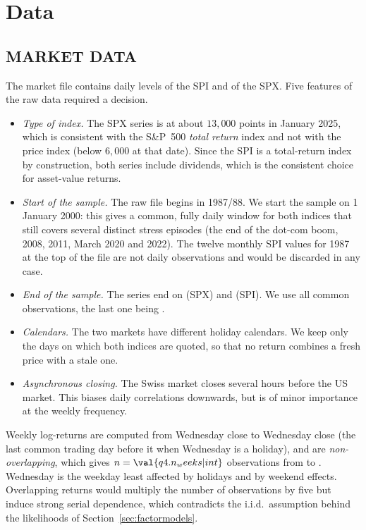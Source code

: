 \section{Data}
\label{sec:data}

\subsection{MARKET DATA}
The market file contains daily levels of the SPI and of the SPX. Five features of the raw data required a decision.
\begin{itemize}
\item \emph{Type of index.} The SPX series is at about $13{,}000$ points in January 2025, which is consistent with the S\&P~500 \emph{total return} index and not with the price index (below $6{,}000$ at that date). Since the SPI is a total-return index by construction, both series include dividends, which is the consistent choice for asset-value returns.
\item \emph{Start of the sample.} The raw file begins in 1987/88. We start the sample on 1 January 2000: this gives a common, fully daily window for both indices that still covers several distinct stress episodes (the end of the dot-com boom, 2008, 2011, March 2020 and 2022). The twelve monthly SPI values for 1987 at the top of the file are not daily observations and would be discarded in any case.
\item \emph{End of the sample.} The series end on  (SPX) and  (SPI). We use all common observations, the last one being .
\item \emph{Calendars.} The two markets have different holiday calendars. We keep only the  days on which both indices are quoted, so that no return combines a fresh price with a stale one.
\item \emph{Asynchronous closing.} The Swiss market closes several hours before the US market. This biases daily correlations downwards, but is of minor importance at the weekly frequency.
\end{itemize}
Weekly log-returns are computed from Wednesday close to Wednesday close (the last common trading day before it when Wednesday is a holiday), and are \emph{non-overlapping}, which gives $n=\val{q4.n_weeks|int}$ observations from  to . Wednesday is the weekday least affected by holidays and by weekend effects. Overlapping returns would multiply the number of observations by five but induce strong serial dependence, which contradicts the i.i.d.\ assumption behind the likelihoods of Section~\ref{sec:factormodels}.

